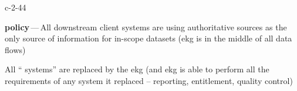 \begin{level-assessment}{c-2-4}{4}

    \item \textbf{policy}\,---\,All downstream client systems are using authoritative sources as the only source of information
          for in-scope datasets (\gls{ekg} is in the middle of all data flows)
    \item All “ systems” are replaced by the \gls{ekg}
          (and \gls{ekg} is able to perform all the requirements of any system it replaced --
          reporting, entitlement, quality control)

\end{level-assessment}
